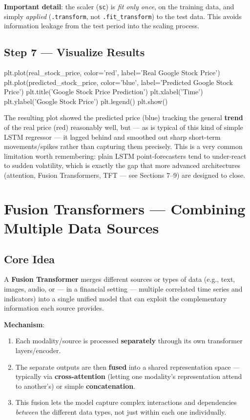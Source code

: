 \documentclass[12pt,openany]{book}
\theoremstyle{definition}
\theoremstyle{remark}
\begin{document}
\textbf{Important detail}: the scaler (\texttt{sc}) is \emph{fit only once}, on the training data, and simply \emph{applied} (\texttt{.transform}, not \texttt{.fit\_transform}) to the test data. This avoids information leakage from the test period into the scaling process.

\subsection{Step 7 --- Visualize Results}

\begin{python}
plt.plot(real_stock_price, color='red', label='Real Google Stock Price')
plt.plot(predicted_stock_price, color='blue', label='Predicted Google Stock Price')
plt.title('Google Stock Price Prediction')
plt.xlabel('Time')
plt.ylabel('Google Stock Price')
plt.legend()
plt.show()
\end{python}

The resulting plot showed the predicted price (blue) tracking the general \textbf{trend} of the real price (red) reasonably well, but --- as is typical of this kind of simple LSTM regressor --- it lagged behind and smoothed out sharp short-term movements/spikes rather than capturing them precisely. This is a very common limitation worth remembering: plain LSTM point-forecasters tend to under-react to sudden volatility, which is exactly the gap that more advanced architectures (attention, Fusion Transformers, TFT --- see Sections 7--9) are designed to close.

\section{Fusion Transformers --- Combining Multiple Data Sources}

\subsection{Core Idea}

A \textbf{Fusion Transformer} merges different sources or types of data (e.g., text, images, audio, or --- in a financial setting --- multiple correlated time series and indicators) into a single unified model that can exploit the complementary information each source provides.

\textbf{Mechanism}:
\begin{enumerate}
\item Each modality/source is processed \textbf{separately} through its own transformer layers/encoder.
\item The separate outputs are then \textbf{fused} into a shared representation space --- typically via \textbf{cross-attention} (letting one modality's representation attend to another's) or simple \textbf{concatenation}.
\item This fusion lets the model capture complex interactions and dependencies \emph{between} the different data types, not just within each one individually.

\end{enumerate}
\end{document}
